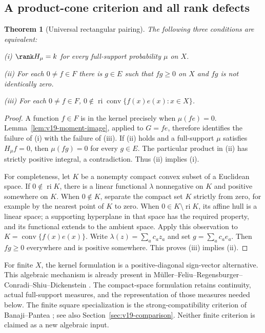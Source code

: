 \documentclass[11pt]{amsart}
\newtheorem{theorem}{Theorem}[section]
\theoremstyle{definition}\newtheorem{definition}[theorem]{Definition}
\theoremstyle{remark}\newtheorem{remark}[theorem]{Remark}
\begin{document}
\subsection{A product-cone criterion and all rank defects}
\begin{theorem}[Universal rectangular pairing]
\label{thm:v19-rectangular}
The following three conditions are equivalent:

\smallskip\noindent\textup{(i)}
$\rank H_\mu=k$ for every full-support probability $\mu$ on $X$.

\smallskip\noindent\textup{(ii)}
For each $0\ne f\in F$ there is $g\in E$ such that $fg\ge0$ on
$X$ and $fg$ is not identically zero.

\smallskip\noindent\textup{(iii)}
For each $0\ne f\in F$,
$0\notin\operatorname{ri}\operatorname{conv}\{f(x)e(x):x\in X\}$.
\end{theorem}
\begin{proof}
A function $f\in F$ is in the kernel precisely when
$\mu(f e)=0$. Lemma~\ref{lem:v19-moment-image}, applied to $G=f e$,
therefore identifies the failure of (i) with the failure of (iii).
If (ii) holds and a full-support $\mu$ satisfies $H_\mu f=0$, then
$\mu(fg)=0$ for every $g\in E$. The particular product in (ii) has
strictly positive integral, a contradiction. Thus (ii) implies (i).

For completeness, let $K$ be a nonempty compact convex subset of a
Euclidean space. If $0\notin\operatorname{ri}K$, there is a linear
functional $\lambda$ nonnegative on $K$ and positive somewhere on
$K$. When $0\notin K$, separate the compact set $K$ strictly from
zero, for example by the nearest point of $K$ to zero. When
$0\in K\setminus\operatorname{ri}K$, its affine hull is a linear
space; a supporting hyperplane in that space has the required property,
and its functional extends to the ambient space. Apply this observation
to $K=\operatorname{conv}\{f(x)e(x)\}$. Write
$\lambda(z)=\sum_a c_a z_a$ and set $g=\sum_a c_a e_a$. Then
$fg\ge0$ everywhere and is positive somewhere. This proves (iii)
implies (ii).
\end{proof}

For finite $X$, the kernel formulation is a positive-diagonal
sign-vector alternative. This algebraic mechanism is already present
in M\"uller--Feliu--Regensburger--Conradi--Shiu--Dickenstein
\cite[Lemma 2.1]{MullerEtAl2016}. The compact-space formulation retains
continuity, actual full-support measures, and the representation of
those measures needed below. The finite square specialization is the
strong-compatibility criterion of Banaji--Pantea
\cite[Definition 2.24 and Lemma 2.36]{BanajiPantea2016}; see also
Section~\ref{sec:v19-comparison}. Neither finite criterion is claimed
as a new algebraic input.
\end{document}
